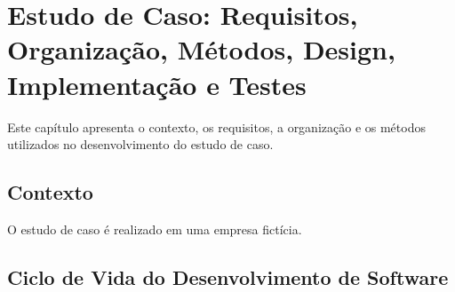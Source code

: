\chapter{Estudo de Caso: Requisitos, Organização, Métodos, Design, Implementação e Testes }
\label{cap:estudo_caso1}
Este capítulo apresenta o contexto, os requisitos, a organização e os métodos utilizados no desenvolvimento do estudo de caso.

\section{Contexto}
\label{section:contexto}
O estudo de caso é realizado em uma empresa fictícia.

\section{Ciclo de Vida do Desenvolvimento de Software}
